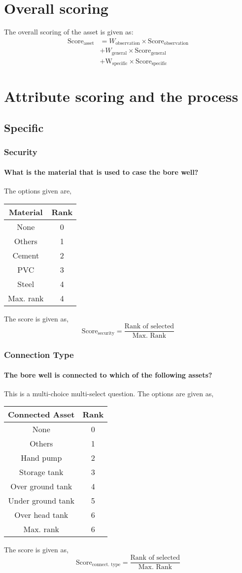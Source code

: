 \documentclass[oneside,twocolumn]{article}
\newcommand{\tsub}[2]{\text{#1}_{\text{#2}}}
\newcommand{\tsubb}[2]{#1_{\text{#2}}}
\newcommand{\dsub}[2]{\dfrac{\text{#1}}{\text{#2}}}
\newenvironment{ttable}
{
\begin{center}
\begin{tabular}{c|c}
\hline
}
{
\\ \hline
\end{tabular}
\end{center}
}
\begin{document}
\section{Overall scoring}
The overall scoring of the asset is given as:
\begin{align*}
	\tsub{Score}{asset} &= \tsubb{W}{observation} \times \tsub{Score}{observation} \\
	&+\tsubb{W}{general} \times \tsub{Score}{general} \\
	&+ \tsub{W}{specific} \times \tsub{Score}{specific}
\end{align*}
\section{Attribute scoring and the process}
\subsection{Specific}
\subsubsection{Security}
\paragraph{What is the material that is used to case the bore well?}
The options given are,
\begin{ttable}
	Material & Rank \\ \hline
	None & 0 \\
	Others & 1 \\
	Cement & 2 \\
	PVC & 3 \\
	Steel & 4 \\ \hline
	Max. rank & 4 
\end{ttable}
The score is given as,
\[
	\tsub{Score}{security} = \dsub{Rank of selected}{Max. Rank}
\]

\subsubsection{Connection Type}
\paragraph{The bore well is connected to which of the following assets?}
This is a multi-choice multi-select question. The options are given as,
\begin{ttable}
	Connected Asset & Rank \\ \hline
	None & 0 \\
	Others & 1 \\
	Hand pump & 2 \\
	Storage tank & 3 \\
	Over ground tank & 4 \\
	Under ground tank & 5 \\
	Over head tank & 6 \\ \hline
	Max. rank & 6
\end{ttable}
The score is given as,
\[
	\tsub{Score}{connect. type} = \dsub{Rank of selected}{Max. Rank}
\]
\end{document}
